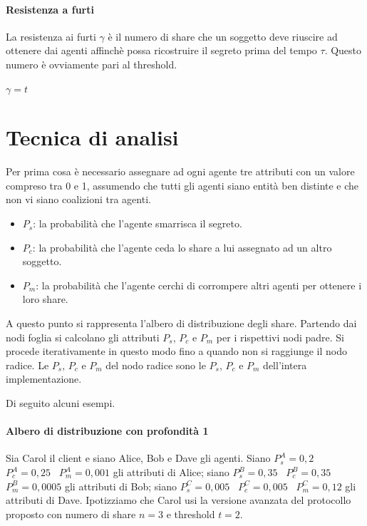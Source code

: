 \paragraph{Resistenza a furti}
La resistenza ai furti $ \gamma $ è il numero di share che un soggetto deve riuscire
ad ottenere dai agenti affinchè possa
ricostruire il segreto prima del tempo $ \tau $.
Questo numero è ovviamente pari al threshold.
\begin{center}
	$ \gamma = t $
\end{center}


\section{Tecnica di analisi}
Per prima cosa è necessario assegnare ad ogni agente tre attributi con un valore
compreso tra 0 e 1, assumendo che tutti gli agenti siano entità ben distinte e
che non vi siano coalizioni tra agenti.

\begin{itemize}
	\item $ P_s $: la probabilità
	      che l'agente smarrisca il segreto.
	\item $ P_c $: la probabilità che l'agente ceda
	      lo share a lui assegnato ad un altro soggetto.
	\item $ P_m $: la probabilità che l'agente cerchi di
	      corrompere altri agenti per ottenere i loro share.
\end{itemize}

A questo punto si rappresenta l'albero di distribuzione degli share.
Partendo dai nodi foglia si calcolano gli attributi $ P_s $, $ P_c $ e $ P_m $
per i rispettivi nodi padre. Si procede iterativamente in questo modo
fino a quando non si raggiunge il nodo radice. Le $ P_s $, $ P_c $ e $ P_m $
del nodo radice sono le $ P_s $, $ P_c $ e $ P_m $ dell'intera implementazione.

Di seguito alcuni esempi.

\paragraph{Albero di distribuzione con profondità 1}
Sia Carol il client e siano Alice, Bob e Dave gli agenti.
Siano
$ P_s^A = 0,2 $ \,
$ P_c^A = 0,25 $ \,
$ P_m^A = 0,001 $
gli attributi di Alice;
siano
$ P_s^B = 0,35 $ \,
$ P_c^B = 0,35 $ \,
$ P_m^B = 0,0005 $
gli attributi di Bob;
siano
$ P_s^C = 0,005 $ \,
$ P_c^C = 0,005 $ \,
$ P_m^C = 0,12 $
gli attributi di Dave.
Ipotizziamo che Carol usi la versione avanzata del protocollo
proposto con numero di share $ n = 3 $ e threshold $ t = 2 $.

